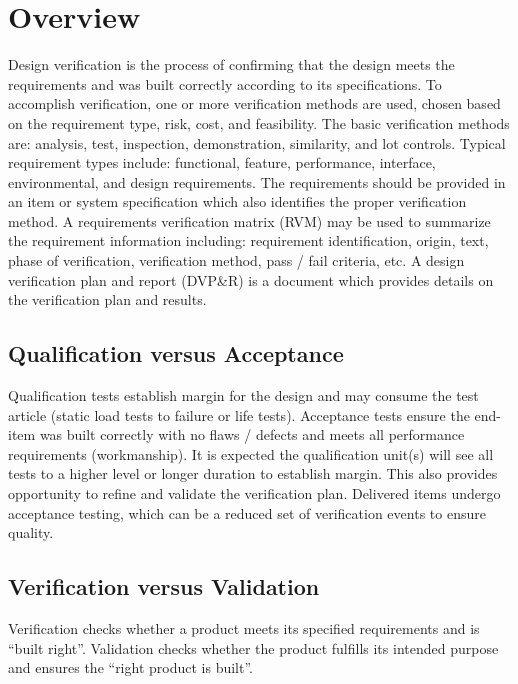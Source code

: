 \documentclass[12pt]{article}
\begin{document}
\newpage

\section{Overview}

Design verification is the process of confirming that the design meets the requirements and was built correctly according to its specifications. 
To accomplish verification, one or more verification methods are used, chosen based on the requirement type, risk, cost, and feasibility. 
The basic verification methods are: analysis, test, inspection, demonstration, similarity, and lot controls. 
Typical requirement types include: functional, feature, performance, interface, environmental, and design requirements. The requirements should be provided in an item or system specification which also identifies the proper verification method. 
A requirements verification matrix (RVM) may be used to summarize the requirement information including: requirement identification, origin, text, phase of verification, verification method, pass / fail criteria, etc. 
A design verification plan and report (DVP\&R) is a document which provides details on the verification plan and results.

\subsection{Qualification versus Acceptance}
Qualification tests establish margin for the design and may consume the test article (static load tests to failure or life tests). Acceptance tests ensure the end-item was built correctly with no flaws / defects and meets all performance requirements (workmanship). 
It is expected the qualification unit(s) will see all tests to a higher level or longer duration to establish margin. 
This also provides opportunity to refine and validate the verification plan. 
Delivered items undergo acceptance testing, which can be a reduced set of verification events to ensure quality.

\subsection{Verification versus Validation}
Verification checks whether a product meets its specified requirements and is “built right”. 
Validation checks whether the product fulfills its intended purpose and ensures the “right product is built”.
\end{document}
